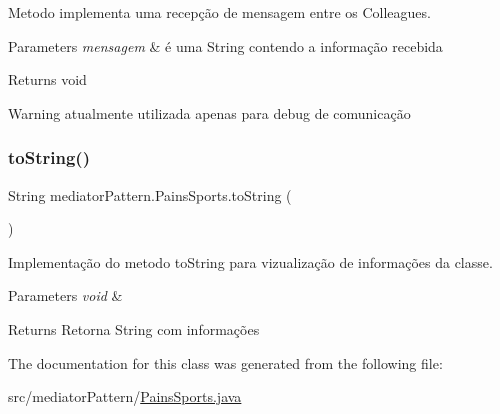 Metodo implementa uma recepção de mensagem entre os Colleagues. 


\begin{DoxyParams}{Parameters}
{\em mensagem} & é uma String contendo a informação recebida \\
\hline
\end{DoxyParams}
\begin{DoxyReturn}{Returns}
void 
\end{DoxyReturn}
\begin{DoxyWarning}{Warning}
atualmente utilizada apenas para debug de comunicação 
\end{DoxyWarning}
\mbox{\label{classmediator_pattern_1_1_pains_sports_a3998f833fa659afc000dc7ae4cafb561}} 
\subsubsection{\texorpdfstring{toString()}{toString()}}
{\footnotesize\ttfamily String mediator\+Pattern.\+Pains\+Sports.\+to\+String (\begin{DoxyParamCaption}{ }\end{DoxyParamCaption})}



Implementação do metodo to\+String para vizualização de informações da classe. 


\begin{DoxyParams}{Parameters}
{\em void} & \\
\hline
\end{DoxyParams}
\begin{DoxyReturn}{Returns}
Retorna String com informações 
\end{DoxyReturn}


The documentation for this class was generated from the following file\+:\begin{DoxyCompactItemize}
\item 
src/mediator\+Pattern/\mbox{\hyperlink{_pains_sports_8java}{Pains\+Sports.\+java}}\end{DoxyCompactItemize}
